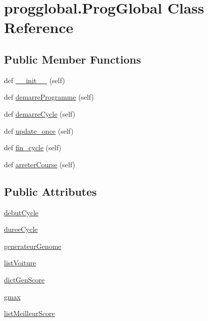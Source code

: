 \hypertarget{classprogglobal_1_1_prog_global}{}\section{progglobal.\+Prog\+Global Class Reference}
\label{classprogglobal_1_1_prog_global}
\subsection*{Public Member Functions}
\begin{DoxyCompactItemize}
\item 
def \hyperlink{classprogglobal_1_1_prog_global_a58f0d1e91fb19db93259697d6c28fb92}{\+\_\+\+\_\+init\+\_\+\+\_\+} (self)
\item 
def \hyperlink{classprogglobal_1_1_prog_global_a11cb363eb2fb2aa7e9edd2f1e4e9ec4d}{demarre\+Programme} (self)
\item 
def \hyperlink{classprogglobal_1_1_prog_global_a7ea91ae18a8a73b4e031f9b178a79c3f}{demarre\+Cycle} (self)
\item 
def \hyperlink{classprogglobal_1_1_prog_global_ab3221f96c5601f1d4e12baf474fb7079}{update\+\_\+once} (self)
\item 
def \hyperlink{classprogglobal_1_1_prog_global_aee583a06f39c3607557f3138fcbd1244}{fin\+\_\+cycle} (self)
\item 
def \hyperlink{classprogglobal_1_1_prog_global_ac5937e41f591bead912a5cc222e335ee}{arreter\+Course} (self)
\end{DoxyCompactItemize}
\subsection*{Public Attributes}
\begin{DoxyCompactItemize}
\item 
\hyperlink{classprogglobal_1_1_prog_global_a52056202bd9de0d78b035856ae42acd8}{debut\+Cycle}
\item 
\hyperlink{classprogglobal_1_1_prog_global_a278ea388fbcadc587c2ad39739903589}{duree\+Cycle}
\item 
\hyperlink{classprogglobal_1_1_prog_global_a7a820f681681623cdf9aff6719cc8c9c}{generateur\+Genome}
\item 
\hyperlink{classprogglobal_1_1_prog_global_a03645d0d3088e80681fcdff58ef2cdfa}{list\+Voiture}
\item 
\hyperlink{classprogglobal_1_1_prog_global_a460adbea5baa5eb525c4270d576b26a1}{dict\+Gen\+Score}
\item 
\hyperlink{classprogglobal_1_1_prog_global_ac533b1088bac8814c0baa0fc7d03f483}{gmax}
\item 
\hyperlink{classprogglobal_1_1_prog_global_a8158d8bc02445a2d5e62aba87d61e721}{list\+Meilleur\+Score}
\end{DoxyCompactItemize}


